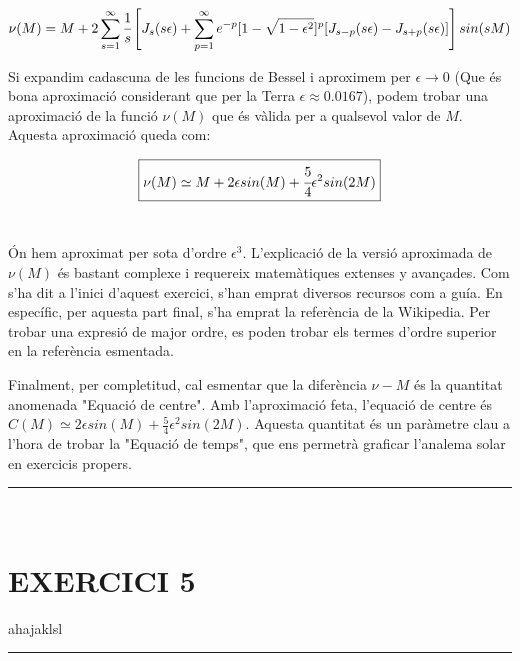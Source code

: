 \documentclass[a4paper, 11pt]{article}
\begin{document}
\begin{equation*}
    \nu(M) = M + 2\sum_{s=1}^{\infty} \cfrac{1}{s} \left[ J_s(s\epsilon) + \sum_{p=1}^{\infty} e^{-p}[1-\sqrt{1-\epsilon^2}]^p[J_{s-p}(s\epsilon) - J_{s+p}(s\epsilon)] \right] sin(sM)
\end{equation*}
\vspace{2mm}

\noindent Si expandim cadascuna de les funcions de Bessel i aproximem per $\epsilon \to 0$ (Que és bona aproximació considerant que per la Terra $\epsilon \approx 0.0167$), podem trobar una aproximació de la funció $\nu(M)$ que és vàlida per a qualsevol valor de $M$. Aquesta aproximació queda com:

\vspace{2mm}
\begin{equation} \label{aproximacio_Mnu}
    \boxed{  \nu(M) \simeq M + 2\epsilon sin(M) + \cfrac{5}{4} \epsilon ^2 sin(2M)  }
\end{equation}\
\vspace{2mm}

\noindent Ón hem aproximat per sota d'ordre $\epsilon^3$. L'explicació de la versió aproximada de $\nu(M)$ és bastant complexe i requereix matemàtiques extenses y avançades. Com s'ha dit a l'inici d'aquest exercici, s'han emprat diversos recursos com a guía. En específic, per aquesta part final, s'ha emprat la referència \cite{EQ_OF_CENTER} de la Wikipedia. Per trobar una expresió de major ordre, es poden trobar els termes d'ordre superior en la referència esmentada.

\vspace{2mm}

\noindent Finalment, per completitud, cal esmentar que la diferència $\nu - M$ és la quantitat anomenada "Equació de centre". Amb l'aproximació feta, l'equació de centre és  $C(M) \simeq 2\epsilon sin(M) + \frac{5}{4} \epsilon ^2 sin(2M)$. Aquesta quantitat és un paràmetre clau a l'hora de trobar la "Equació de temps", que ens permetrà graficar l'analema solar en exercicis propers.

\vspace{10mm}
\hrule\
\vspace{5mm}


\section*{EXERCICI 5}
\noindent ahajaklsl
\vspace{10mm}
\hrule\
\vspace{5mm}
\end{document}
